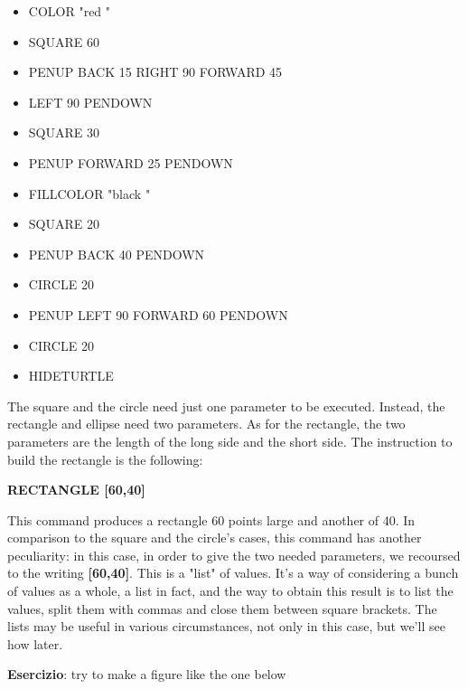\begin{scriptsize}
\begin{minipage}{0.40\textwidth}
\begin{itemize}[itemsep=-3pt,parsep=2pt]
\item[] COLOR  "red " 
\item[] SQUARE 60 
\item[] PENUP BACK 15 RIGHT 90 FORWARD 45                      
\item[] LEFT 90 PENDOWN 
\item[] SQUARE 30 
\item[] PENUP FORWARD 25 PENDOWN 
\item[] FILLCOLOR  "black "                      
\item[] SQUARE 20 
\item[] PENUP BACK 40 PENDOWN 
\item[] CIRCLE 20                                              
\item[] PENUP LEFT 90 FORWARD 60 PENDOWN 
\item[] CIRCLE 20
\item[] HIDETURTLE                                            
\end{itemize}
\end{minipage}
\end{scriptsize}

\vskip 1cm


The square and the circle need just one parameter to be executed. Instead, the rectangle and ellipse need two parameters. As for the rectangle, the two parameters are the length of the long side and the short side. The instruction to build the rectangle is the following:

\textbf{RECTANGLE [60,40]}

This command produces a rectangle 60 points large and another of 40. In comparison to the square and the circle's cases, this command has another peculiarity: in this case, in order to give the two needed parameters, we recoursed to the writing \textbf{[60,40]}. This is a "list" of values. It's a way of considering a bunch of values as a whole, a list in fact, and the way to obtain this result is to list the values, split them with commas and close them between square brackets. The lists may be useful in various circumstances, not only in this case, but we'll see how later.

\textbf{Esercizio}: try to make a figure like the one below

\vskip 1cm

